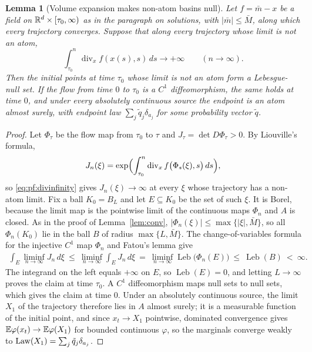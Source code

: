 \documentclass{article} %
\theoremstyle{plain}
\newtheorem{lemma}[theorem]{Lemma}
\theoremstyle{definition}
\theoremstyle{remark}
\begin{document}
\begin{lemma}[Volume expansion makes non-atom basins null]
\label{lem:volume}
Let $f=\bar m-x$ be a field on $\mathbb{R}^d\times[\tau_0,\infty)$ as in the paragraph on solutions,
with $|\bar m|\le\bar M$, along which every trajectory converges. Suppose that along every
trajectory whose limit is not an atom,
\begin{equation}
\int_{\tau_0}^n\operatorname{div}_xf(x(s),s)\,ds\longrightarrow+\infty\qquad(n\to\infty).
\label{eq:pf:divinfinity}
\end{equation}
Then the initial points at time $\tau_0$ whose limit is not an atom form a Lebesgue-null set. If
the flow from time $0$ to $\tau_0$ is a $C^1$ diffeomorphism, the same holds at time $0$, and
under every absolutely continuous source the endpoint is an atom almost surely, with endpoint law
$\sum_j\tilde q_j\delta_{a_j}$ for some probability vector $\tilde q$.
\end{lemma}
\begin{proof}
Let $\Phi_\tau$ be the flow map from $\tau_0$ to $\tau$ and $J_\tau=\det D\Phi_\tau>0$. By
Liouville's formula,
\[
J_n(\xi)=\exp\Bigl(\int_{\tau_0}^n\operatorname{div}_xf\bigl(\Phi_s(\xi),s\bigr)\,ds\Bigr),
\]
so \eqref{eq:pf:divinfinity} gives $J_n(\xi)\to\infty$ at every $\xi$ whose trajectory has a
non-atom limit. Fix a ball $K_0=B_L$ and let $E\subseteq K_0$ be the set of such $\xi$. It is Borel,
because the limit map is the pointwise limit of the continuous maps $\Phi_n$ and $A$ is closed. As
in the proof of Lemma~\ref{lem:conv}, $|\Phi_n(\xi)|\le\max\{|\xi|,\bar M\}$, so all $\Phi_n(K_0)$
lie in the ball $B$ of radius $\max\{L,\bar M\}$. The change-of-variables formula for the injective
$C^1$ map $\Phi_n$ and Fatou's lemma give
\begin{align*}
\int_E\liminf_{n\to\infty}J_n\,d\xi
\ \le\ \liminf_{n\to\infty}\int_EJ_n\,d\xi
\ =\ \liminf_{n\to\infty}\operatorname{Leb}\bigl(\Phi_n(E)\bigr)
\ \le\ \operatorname{Leb}(B)\ <\ \infty .
\end{align*}
The integrand on the left equals $+\infty$ on $E$, so $\operatorname{Leb}(E)=0$, and letting
$L\to\infty$ proves the claim at time $\tau_0$. A $C^1$ diffeomorphism maps null sets to null
sets, which gives the claim at time $0$. Under an absolutely continuous source, the limit $X_1$ of
the trajectory therefore lies in $A$ almost surely; it is a measurable function of the initial
point, and since $x_t\to X_1$ pointwise, dominated convergence gives
$\mathbb{E}\varphi(x_t)\to\mathbb{E}\varphi(X_1)$ for bounded continuous $\varphi$, so the marginals converge
weakly to $\mathrm{Law}(X_1)=\sum_j\tilde q_j\delta_{a_j}$.
\end{proof}
\end{document}
